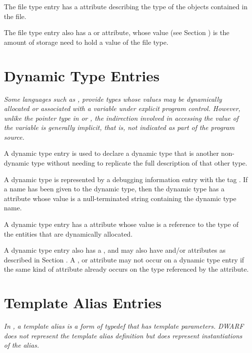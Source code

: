 The file type entry has 
a \DWATtype{} attribute describing
the type of the objects contained in the file.

The file type entry also has a 
\DWATbytesize{} or
\DWATbitsize{} attribute, whose value 
(see Section )
is the amount of storage need to hold a value of the file type.

\section{Dynamic Type Entries}
\label{chap:dynamictypeentries}
\textit{Some languages such as 
, provide types whose values
may be dynamically allocated or associated with a variable
under explicit program control. However, unlike the
pointer type in  or 
, the indirection involved in accessing
the value of the variable is generally implicit, that is, not
indicated as part of the program source.}

A dynamic type entry is used to declare a dynamic type that is 
 another non-dynamic type without needing to
replicate the full description of that other type.

A dynamic type is represented by a debugging information entry
with the tag \DWTAGdynamictypeTARG. If a name has been given to the
dynamic type, then the dynamic type has a \DWATname{} attribute 
whose value is a null-terminated string containing the dynamic
type name.
\bbeb
	
A dynamic type entry has a \DWATtype{} attribute whose value is a
reference to the type of the entities that are dynamically allocated.
	
A dynamic type entry also has a \DWATdatalocation, and may also
have \DWATallocated{} and/or \DWATassociated{} attributes as 
described in Section . 
A \DWATdatalocation, \DWATallocated{} or \DWATassociated{} attribute 
may not occur on a dynamic type entry if the same kind of attribute 
already occurs on the type referenced by the \DWATtype{} attribute.


\section{Template Alias Entries}
\label{chap:templatealiasentries}

\textit{In , a template alias is a form of typedef that has template
parameters.  DWARF does not represent the template alias definition
but does represent instantiations of the alias.}

